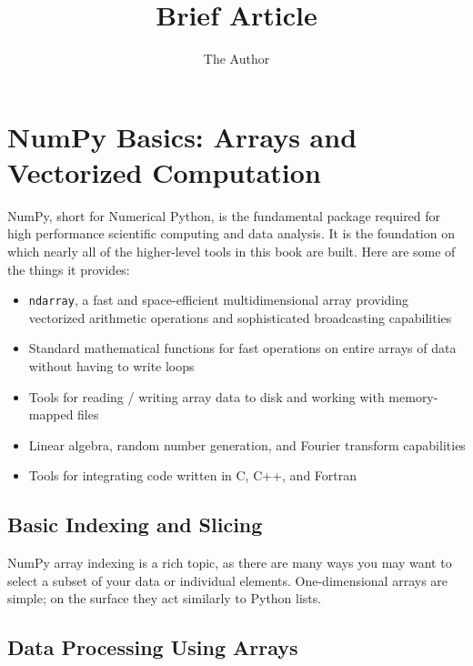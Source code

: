 \documentclass[11pt]{article} %
\title{Brief Article}
\author{The Author}
\begin{document}
\section{NumPy Basics: Arrays and Vectorized Computation}

NumPy, short for Numerical Python, is the fundamental package required for high
performance scientific computing and data analysis. It is the foundation on which
nearly all of the higher-level tools in this book are built. Here are some of the things it
provides:

\begin{itemize}
\item \texttt{ndarray}, a fast and space-efficient multidimensional array providing vectorized
arithmetic operations and sophisticated broadcasting capabilities
\item Standard mathematical functions for fast operations on entire arrays of data
without having to write loops
\item Tools for reading / writing array data to disk and working with memory-mapped
files
\item Linear algebra, random number generation, and Fourier transform capabilities
\item Tools for integrating code written in C, C++, and Fortran
\end{itemize}

\newpage

\subsection{Basic Indexing and Slicing}
NumPy array indexing is a rich topic, as there are many ways you may want to select
a subset of your data or individual elements. One-dimensional arrays are simple; on
the surface they act similarly to Python lists.
\subsection{Data Processing Using Arrays}
\end{document}
